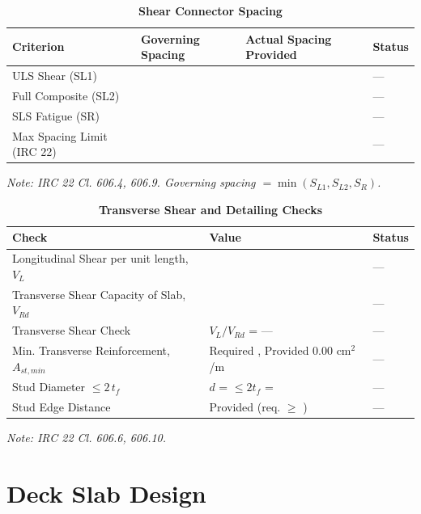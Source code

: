 \documentclass[12pt,a4paper]{report}
\numberwithin{table}{chapter}
\numberwithin{figure}{chapter}
\begin{document}
\vspace{1em}

\setlength\LTleft{0pt}
\setlength\LTright{\fill}

\begin{longtable}{|L{3.2cm}|>{\centering\arraybackslash}p{4.3cm}|>{\centering\arraybackslash}p{4.3cm}|C{2.0cm}|}
\caption{\textbf{Shear Connector Spacing}}
\hline
\textbf{Criterion} & \textbf{Governing Spacing} & \textbf{Actual Spacing Provided} & \textbf{Status} \\[6pt]
\hline
ULS Shear (SL1) &  &  & --- \\[6pt]
\hline
Full Composite (SL2) &  &  & --- \\[6pt]
\hline
SLS Fatigue (SR) &  &  & --- \\[6pt]
\hline
Max Spacing Limit (IRC 22) &  &  & --- \\[6pt]
\hline
\end{longtable}
\noindent\textit{Note: IRC 22 Cl. 606.4, 606.9. Governing spacing $= \min(S_{L1}, S_{L2}, S_R)$.}

\vspace{1em}
\begin{longtable}{|L{5.3cm}|>{\arraybackslash}p{7.2cm}|C{2.0cm}|}
\caption{\textbf{Transverse Shear and Detailing Checks}}
\hline
\textbf{Check} & \textbf{Value} & \textbf{Status} \\[6pt]
\hline
\textnormal{Longitudinal Shear per unit length, $V_L$} &  & --- \\[6pt]
\hline
\textnormal{Transverse Shear Capacity of Slab, $V_{Rd}$} &  & --- \\[6pt]
\hline
\textnormal{Transverse Shear Check} & $V_L/V_{Rd}$ = --- & --- \\[6pt]
\hline
\textnormal{Min. Transverse Reinforcement, $A_{st,min}$} & Required , Provided 0.00 cm$^2$/m & --- \\[6pt]
\hline
\textnormal{Stud Diameter $\leq 2\,t_f$} & $d$ =  $\leq 2t_f$ =  & --- \\[6pt]
\hline
\textnormal{Stud Edge Distance} & Provided  (req. $\geq$ ) & --- \\[6pt]
\hline
\end{longtable}
\noindent\textit{Note: IRC 22 Cl. 606.6, 606.10.}

\section{Deck Slab Design}
\label{sec:deck-design}
\end{document}
